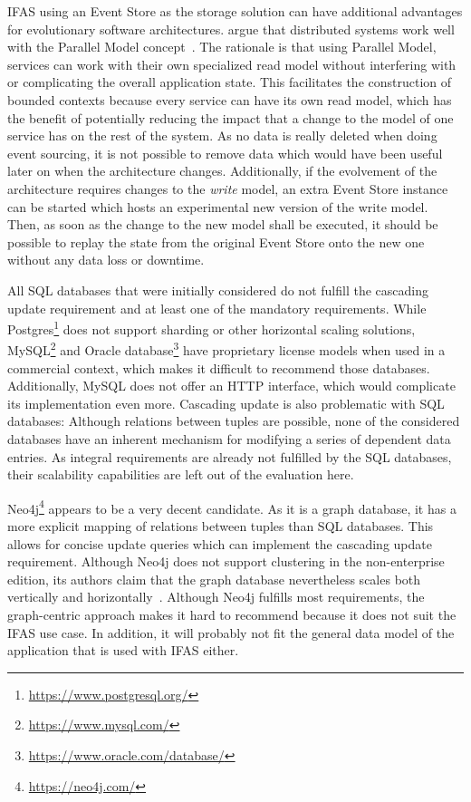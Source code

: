 \ac{IFAS} using an Event Store as the storage solution can have additional advantages for evolutionary software architectures.
\citet{ford2017building} argue that distributed systems work well with the Parallel Model concept~\cite{WEB:Fowler:2005-2}.
The rationale is that using Parallel Model, services can work with their own specialized read model without interfering with or complicating the overall application state.
This facilitates the construction of bounded contexts because every service can have its own read model, which has the benefit of potentially reducing the impact that a change to the model of one service has on the rest of the system.
As no data is really deleted when doing event sourcing, it is not possible to remove data which would have been useful later on when the architecture changes.
Additionally, if the evolvement of the architecture requires changes to the \emph{write} model, an extra Event Store instance can be started which hosts an experimental new version of the write model.
Then, as soon as the change to the new model shall be executed, it should be possible to replay the state from the original Event Store onto the new one without any data loss or downtime.

All \ac{SQL} databases that were initially considered do not fulfill the cascading update requirement and at least one of the mandatory requirements.
While Postgres\footnote{\url{https://www.postgresql.org/}} does not support sharding or other horizontal scaling solutions, MySQL\footnote{\url{https://www.mysql.com/}} and Oracle database\footnote{\url{https://www.oracle.com/database/}} have proprietary license models when used in a commercial context, which makes it difficult to recommend those databases.
Additionally, MySQL does not offer an HTTP interface, which would complicate its implementation even more.
Cascading update is also problematic with \ac{SQL} databases: Although relations between tuples are possible, none of the considered databases have an inherent mechanism for modifying a series of dependent data entries.
As integral requirements are already not fulfilled by the \ac{SQL} databases, their scalability capabilities are left out of the evaluation here.

Neo4j\footnote{\url{https://neo4j.com/}} appears to be a very decent candidate.
As it is a graph database, it has a more explicit mapping of relations between tuples than \ac{SQL} databases.
This allows for concise update queries which can implement the cascading update requirement.
Although Neo4j does not support clustering in the non-enterprise edition, its authors claim that the graph database nevertheless scales both vertically and horizontally~\cite{Neo4jScalability}.
Although Neo4j fulfills most requirements, the graph-centric approach makes it hard to recommend because it does not suit the \ac{IFAS} use case.
In addition, it will probably not fit the general data model of the application that is used with \ac{IFAS} either.

